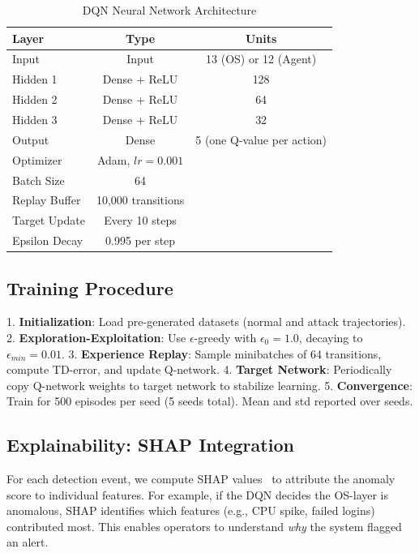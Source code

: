\documentclass[conference]{IEEEtran}
\begin{document}
\begin{table}[h]
\centering
\caption{DQN Neural Network Architecture}
\label{tab:nn_arch}
\begin{tabular}{lcc}
\toprule
Layer & Type & Units \\
\midrule
Input & Input & 13 (OS) or 12 (Agent) \\
Hidden 1 & Dense + ReLU & 128 \\
Hidden 2 & Dense + ReLU & 64 \\
Hidden 3 & Dense + ReLU & 32 \\
Output & Dense & 5 (one Q-value per action) \\
\toprule
Optimizer & Adam, $lr=0.001$ \\
Batch Size & 64 \\
Replay Buffer & 10,000 transitions \\
Target Update & Every 10 steps \\
Epsilon Decay & 0.995 per step \\
\bottomrule
\end{tabular}
\end{table}

\subsection{Training Procedure}

1. \textbf{Initialization}: Load pre-generated datasets (normal and attack trajectories).
2. \textbf{Exploration-Exploitation}: Use $\epsilon$-greedy with $\epsilon_0 = 1.0$, decaying to $\epsilon_{min} = 0.01$.
3. \textbf{Experience Replay}: Sample minibatches of 64 transitions, compute TD-error, and update Q-network.
4. \textbf{Target Network}: Periodically copy Q-network weights to target network to stabilize learning.
5. \textbf{Convergence}: Train for 500 episodes per seed (5 seeds total). Mean and std reported over seeds.

\subsection{Explainability: SHAP Integration}

For each detection event, we compute SHAP values~\cite{lundberg2017unified} to attribute the anomaly score to individual features. For example, if the DQN decides the OS-layer is anomalous, SHAP identifies which features (e.g., CPU spike, failed logins) contributed most. This enables operators to understand \emph{why} the system flagged an alert.
\end{document}
